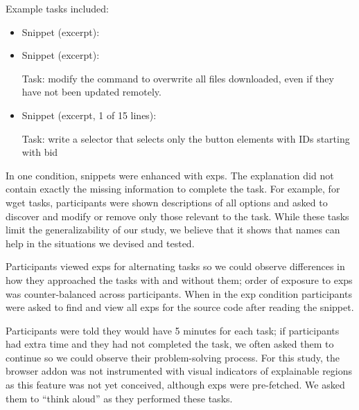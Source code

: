 Example tasks included:
\begin{itemize}

\item
Snippet (excerpt):

\item
Snippet (excerpt):


Task: modify the command to overwrite all files downloaded, even if they have not been updated remotely.

\item

Snippet (excerpt, 1 of 15 lines):


Task: write a selector that selects only the button elements with IDs starting with bid

\end{itemize}
\fi
%
\begin{changes}
In one condition, snippets were enhanced with \glspl{exp}.
The explanation did not contain exactly the missing information to complete the task.
For example, for wget tasks, participants were shown descriptions of all options and asked to discover and modify or remove only those relevant to the task.
While these tasks limit the generalizability of our study, we believe that it shows that \Glspl{name} can help in the situations we devised and tested.

Participants viewed \glspl{exp} for alternating tasks so we could observe differences in how they approached the tasks with and without them; order of exposure to \glspl{exp} was counter-balanced across participants. 
When in the \gls{exp} condition participants were asked to find and view all \glspl{exp} for the source code after reading the snippet.

Participants were told they would have 5 minutes for each task; if participants had extra time and they had not completed the task, we often asked them to continue so we could observe their problem-solving process.
For this study, the browser addon was not instrumented with visual indicators of explainable regions as this feature was not yet conceived, although \glspl{exp} were pre-fetched.
We asked them to ``think aloud'' as they performed these tasks.

\end{changes}

